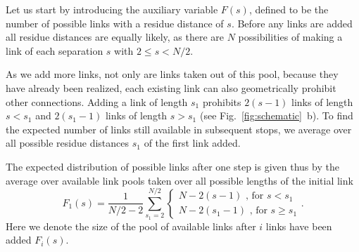 \documentclass[
reprint,
twocolumn,
amsmath,amssymb,superscriptaddress,aps,
pre]{revtex4-1}
\begin{document}
Let us start by introducing the auxiliary variable $F(s)$, defined to be the number of possible links with a residue distance of $s$. Before any links are added all residue distances are equally likely, as there are $N$ possibilities of making a link of each separation $s$ with $2\leq s < N/2$.

As we add more links, not only are links taken out of this pool, because they have already been realized, each existing link can also geometrically prohibit other connections. Adding a link of length $s_1$ prohibits $2(s-1)$ links of length $s<s_1$ and $2(s_1-1)$ links of length $s>s_1$ (see Fig.~\ref{fig:schematic}~b). To find the expected number of links still available in subsequent stops, we average over all possible residue distances $s_1$ of the first link added.

The expected distribution of possible links after one step is given thus by the average over available link pools taken over all possible lengths of the initial link
\begin{equation}
    F_1(s)= \frac{1}{N/2-2} \sum_{s_1=2}^{N/2} { \begin{cases}
    N-2(s-1) \text{ , for } s<s_1\\
    N-2(s_1 -1)\text{ , for } s\geq s_1
    \end{cases}}.
\end{equation}
Here we denote the size of the pool of available links after $i$ links have been added $F_i(s)$.
\end{document}
